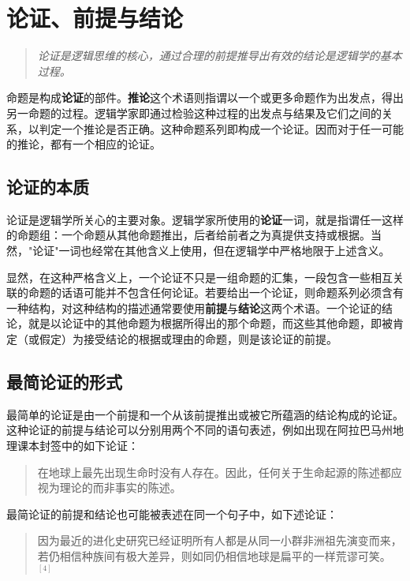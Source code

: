 \section{论证、前提与结论}

\begin{quotation}
\textit{论证是逻辑思维的核心，通过合理的前提推导出有效的结论是逻辑学的基本过程。}
\end{quotation}

命题是构成\textbf{论证}的部件。\textbf{推论}这个术语则指谓以一个或更多命题作为出发点，得出另一命题的过程。逻辑学家即通过检验这种过程的出发点与结果及它们之间的关系，以判定一个推论是否正确。这种命题系列即构成一个论证。因而对于任一可能的推论，都有一个相应的论证。

\subsection{论证的本质}

论证是逻辑学所关心的主要对象。逻辑学家所使用的\textbf{论证}一词，就是指谓任一这样的命题组：一个命题从其他命题推出，后者给前者之为真提供支持或根据。当然，"论证"一词也经常在其他含义上使用，但在逻辑学中严格地限于上述含义。

显然，在这种严格含义上，一个论证不只是一组命题的汇集，一段包含一些相互关联的命题的话语可能并不包含任何论证。若要给出一个论证，则命题系列必须含有一种结构，对这种结构的描述通常要使用\textbf{前提}与\textbf{结论}这两个术语。一个论证的结论，就是以论证中的其他命题为根据所得出的那个命题，而这些其他命题，即被肯定（或假定）为接受结论的根据或理由的命题，则是该论证的前提。

\subsection{最简论证的形式}

最简单的论证是由一个前提和一个从该前提推出或被它所蕴涵的结论构成的论证。这种论证的前提与结论可以分别用两个不同的语句表述，例如出现在阿拉巴马州地理课本封签中的如下论证：

\begin{quotation}
在地球上最先出现生命时没有人存在。因此，任何关于生命起源的陈述都应视为理论的而非事实的陈述。
\end{quotation}

最简论证的前提和结论也可能被表述在同一个句子中，如下述论证：

\begin{quotation}
因为最近的进化史研究已经证明所有人都是从同一小群非洲祖先演变而来，若仍相信种族间有极大差异，则如同仍相信地球是扁平的一样荒谬可笑。${}^{[4]}$
\end{quotation}

